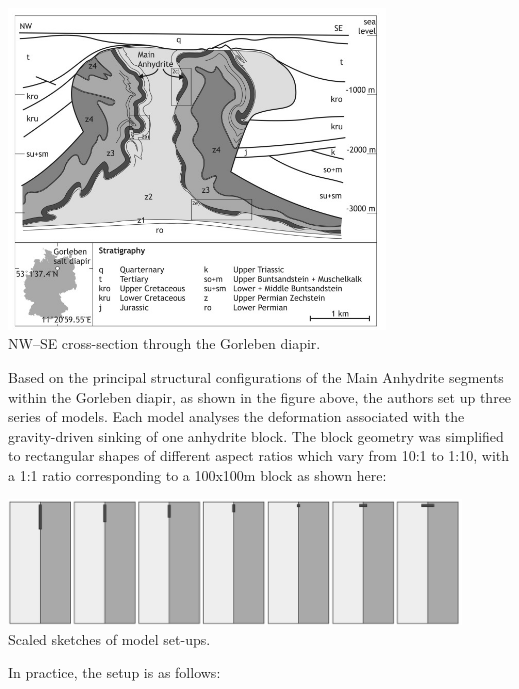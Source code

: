 \begin{center}
\includegraphics[width=10cm]{python_codes/fieldstone_67/images/buks12a}\\
{\captionfont NW–SE cross-section through the Gorleben diapir.}
\end{center}

Based on the principal structural configurations of the Main Anhydrite 
segments within the Gorleben diapir, as shown in the figure above, 
the authors set up three series of
models. Each model analyses the deformation associated with the gravity-driven sinking
of one anhydrite block. The block geometry was simplified to rectangular shapes
of different aspect ratios which vary from 10:1 to 1:10, 
with a 1:1 ratio corresponding to a 100x100m block as shown here:

\begin{center}
\includegraphics[width=12cm]{python_codes/fieldstone_67/images/buks12b}\\
{\captionfont Scaled sketches of model set-ups.}
\end{center}

In practice, the setup is as follows:

